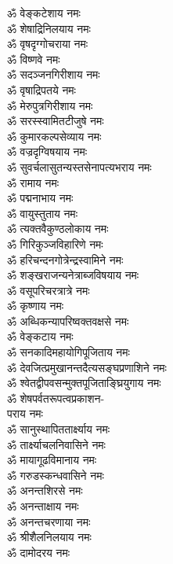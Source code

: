 \begin{multicols}{2}
\begin{flushleft}
ॐ वेङ्कटेशाय नमः\\
ॐ शेषाद्रिनिलयाय नमः\\
ॐ वृषदृग्गोचराया नमः\\
ॐ विष्णवे नमः\\
ॐ सदञ्जनगिरीशाय नमः\\
ॐ वृषाद्रिपतये नमः\\
ॐ मेरुपुत्रगिरीशाय नमः\\
ॐ सरस्स्वामितटीजुषे नमः\\
ॐ कुमारकल्पसेव्याय नमः\\
ॐ वज्रदृग्विषयाय नमः\hfill{}\\
ॐ सुवर्चलासुत\-न्यस्तसेनापत्यभराय नमः\\
ॐ रामाय नमः\\
ॐ पद्मनाभाय नमः\\
ॐ वायुस्तुताय नमः\\
ॐ त्यक्तवैकुण्ठलोकाय नमः\\
ॐ गिरिकुञ्जविहारिणे नमः\\
ॐ हरिचन्दनगोत्रेन्द्रस्वामिने नमः\\
ॐ शङ्खराजन्यनेत्राब्जविषयाय नमः\\
ॐ वसूपरिचरत्रात्रे नमः\\
ॐ कृष्णाय नमः\hfill{}\\
ॐ अब्धिकन्यापरिष्वक्तवक्षसे नमः\\
ॐ वेङ्कटाय नमः\\
ॐ सनकादिमहायोगि\-पूजिताय नमः\\
ॐ देवजित्प्रमुखानन्त\-दैत्यसङ्घप्रणाशिने नमः\\
ॐ श्वेतद्वीप\-वसन्मुक्तपूजिताङ्घ्रियुगाय नमः\\
ॐ शेषपर्वत\-रूपत्वप्रकाशन-\\पराय नमः\\
ॐ सानुस्थापिततार्क्ष्याय नमः\\
ॐ तार्क्ष्याचलनिवासिने नमः\\
ॐ मायागूढविमानाय नमः\\
ॐ गरुडस्कन्धवासिने नमः\hfill{}\\
ॐ अनन्तशिरसे नमः\\
ॐ अनन्ताक्षाय नमः\\
ॐ अनन्तचरणाया नमः\\
ॐ श्रीशैलनिलयाय नमः\\
ॐ दामोदरय नमः\\

\end{flushleft}
\end{multicols}
